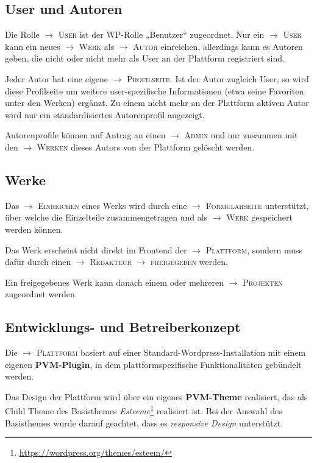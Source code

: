 \documentclass[a4paper,11pt]{article}
\newcommand{\glossar}[1]{{$\to$ \textsc{#1}}}
\begin{document}
\subsection{User und Autoren}

Die Rolle \glossar{User} ist der WP-Rolle „Benutzer“ zugeordnet. Nur ein
\glossar{User} kann ein neues \glossar{Werk} als \glossar{Autor} einreichen,
allerdings kann es Autoren geben, die nicht oder nicht mehr als User an der
Plattform registriert sind.

Jeder Autor hat eine eigene \glossar{Profilseite}. Ist der Autor zugleich User,
so wird diese Profilseite um weitere user-spezifische Informationen (etwa seine
Favoriten unter den Werken) ergänzt.  Zu einem nicht mehr an der Plattform
aktiven Autor wird nur ein standardisiertes Autorenprofil angezeigt.

Autorenprofile können auf Antrag an einen \glossar{Admin} und nur zusammen mit
den \glossar{Werken} dieses Autors von der Plattform gelöscht werden.

\subsection{Werke}

Das \glossar{Einreichen} eines Werks wird durch eine \glossar{Formularseite}
unterstützt, über welche die Einzelteile zusammengetragen und als
\glossar{Werk} gespeichert werden können.

Das Werk erscheint nicht direkt im Frontend der \glossar{Plattform}, sondern
muss dafür durch einen \glossar{Redakteur} \glossar{freigegeben} werden.

Ein freigegebenes Werk kann danach einem oder mehreren \glossar{Projekten}
zugeordnet werden.

\subsection{Entwicklungs- und Betreiberkonzept}
\label{grundlagen.betreiberkonzept}

Die \glossar{Plattform} basiert auf einer Standard-Wordpress-Installation mit
einem eigenen \textbf{PVM-Plugin}, in dem plattformspezifische Funktionalitäten
gebündelt werden.

Das Design der Plattform wird über ein eigenes \textbf{PVM-Theme} realisiert,
das als Child Theme des Basisthemes
\emph{Esteeme}\footnote{\url{https://wordpress.org/themes/esteem/}} realisiert
ist.  Bei der Auswahl des Basisthemes wurde darauf geachtet, dass es
\emph{responsive Design} unterstützt.
\end{document}
